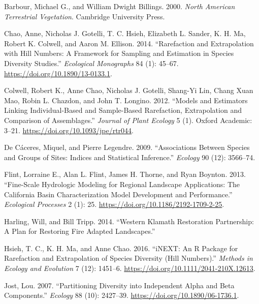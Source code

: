 \documentclass[]{article}
\begin{document}
\leavevmode\hypertarget{ref-barbourNorthAmericanTerrestrial2000}{}%
Barbour, Michael G., and William Dwight Billings. 2000. \emph{North
American Terrestrial Vegetation}. Cambridge University Press.

\leavevmode\hypertarget{ref-chaoRarefactionExtrapolationHill2014}{}%
Chao, Anne, Nicholas J. Gotelli, T. C. Hsieh, Elizabeth L. Sander, K. H.
Ma, Robert K. Colwell, and Aaron M. Ellison. 2014. ``Rarefaction and
Extrapolation with Hill Numbers: A Framework for Sampling and Estimation
in Species Diversity Studies.'' \emph{Ecological Monographs} 84 (1):
45--67. \url{https://doi.org/10.1890/13-0133.1}.

\leavevmode\hypertarget{ref-colwellModelsEstimatorsLinking2012}{}%
Colwell, Robert K., Anne Chao, Nicholas J. Gotelli, Shang-Yi Lin, Chang
Xuan Mao, Robin L. Chazdon, and John T. Longino. 2012. ``Models and
Estimators Linking Individual-Based and Sample-Based Rarefaction,
Extrapolation and Comparison of Assemblages.'' \emph{Journal of Plant
Ecology} 5 (1). Oxford Academic: 3--21.
\url{https://doi.org/10.1093/jpe/rtr044}.

\leavevmode\hypertarget{ref-decaceresAssociationsSpeciesGroups2009}{}%
De Cáceres, Miquel, and Pierre Legendre. 2009. ``Associations Between
Species and Groups of Sites: Indices and Statistical Inference.''
\emph{Ecology} 90 (12): 3566--74.

\leavevmode\hypertarget{ref-flintFinescaleHydrologicModeling2013}{}%
Flint, Lorraine E., Alan L. Flint, James H. Thorne, and Ryan Boynton.
2013. ``Fine-Scale Hydrologic Modeling for Regional Landscape
Applications: The California Basin Characterization Model Development
and Performance.'' \emph{Ecological Processes} 2 (1): 25.
\url{https://doi.org/10.1186/2192-1709-2-25}.

\leavevmode\hypertarget{ref-harlingWesternKlamathRestoration2014}{}%
Harling, Will, and Bill Tripp. 2014. ``Western Klamath Restoration
Partnership: A Plan for Restoring Fire Adapted Landscapes.''

\leavevmode\hypertarget{ref-hsiehINEXTPackageRarefaction2016}{}%
Hsieh, T. C., K. H. Ma, and Anne Chao. 2016. ``iNEXT: An R Package for
Rarefaction and Extrapolation of Species Diversity (Hill Numbers).''
\emph{Methods in Ecology and Evolution} 7 (12): 1451--6.
\url{https://doi.org/10.1111/2041-210X.12613}.

\leavevmode\hypertarget{ref-jostPartitioningDiversityIndependent2007}{}%
Jost, Lou. 2007. ``Partitioning Diversity into Independent Alpha and
Beta Components.'' \emph{Ecology} 88 (10): 2427--39.
\url{https://doi.org/10.1890/06-1736.1}.
\end{document}
